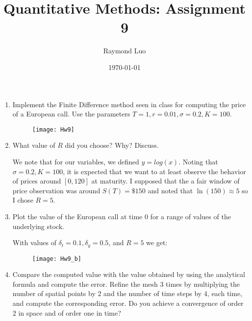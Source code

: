 \documentclass[12pt,twoside, letter]{exam}
\theoremstyle{definition}
\begin{document}
\abovedisplayskip=12pt
\belowdisplayskip=12pt
\abovedisplayshortskip=7pt
\belowdisplayshortskip=10pt
\allowdisplaybreaks

\setlength{\parindent}{18pt}

\title{Quantitative Methods: Assignment 9}
\author{Raymond Luo}
\date{\today}
\maketitle

\begin{enumerate}
  \item Implement the Finite Difference method seen in class for computing the price
    of a European call. Use the parameters $T = 1, r= 0.01, \sigma = 0.2, K=100$.
    \begin{solution}
      \begin{figure}[H]
        \centering
          \texttt{[image: Hw9]}
      \end{figure}
    \end{solution}
  \item What value of $R$ did you choose? Why? Discuss.
    \begin{solution}
      We note that for our variables, we defined $y = log(x)$. Noting that $\sigma = 0.2, K = 100$,
      it is expected that we want to at least observe the behavior of prices around $[0,120]$ at maturity.
      I supposed that the a fair window of price observation was around $S(T) = \$150$ and noted that
      $\ln(150) \approx 5$ so I chose $R = 5$.
    \end{solution}
  \item Plot the value of the European call at time $0$ for a range of values of the underlying
    stock.
      \begin{solution}
        With values of $\delta_t = 0.1, \delta_y = 0.5$, and $R = 5$ we get: \\
        \begin{figure}[H]
          \centering
            \texttt{[image: Hw9\_b]}
        \end{figure}
      \end{solution}
  \item Compare the computed value with the value obtained by using the analytical formula
    and compute the error. Refine the mesh 3 times by multiplying the number of spatial points
    by 2 and the number of time steps by 4, each time, and compute the corresponding error.
    Do you achieve a convergence of order 2 in space and of order one in time?

\end{enumerate}
\end{document}
